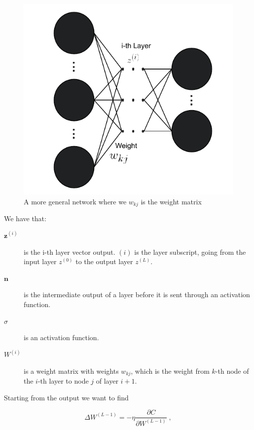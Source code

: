 \begin{figure}[H]
    \centering
    \includegraphics{Figures/Drawn/machinelearning/generalnetwork.pdf}
    \caption{A more general network where we $w_{kj}$ is the weight matrix}
    \label{fig:gennet}
\end{figure}

We have that:

\begin{description}
    \item[$\boldsymbol{z}^{(i)}$] is the i-th layer vector output. $(i)$ is the layer subscript, going from the input layer $z^{(0)}$ to the output layer $z^{(L)}$.
    \item[$\boldsymbol{n}$] is the intermediate output of a layer before it is sent through an activation function.
    \item[$\sigma$] is an activation function.
    \item[$W^{(i)}$] is a weight matrix with weights $w_{kj}$, which is the weight from $k$-th node of the $i$-th layer to node $j$ of layer $i+1$.
     
\end{description}

Starting from the output we want to find

\begin{equation}
    \Delta W^{(L-1)} = -\eta\frac{\partial C}{\partial W^{(L-1)}} \; ,
\end{equation}

